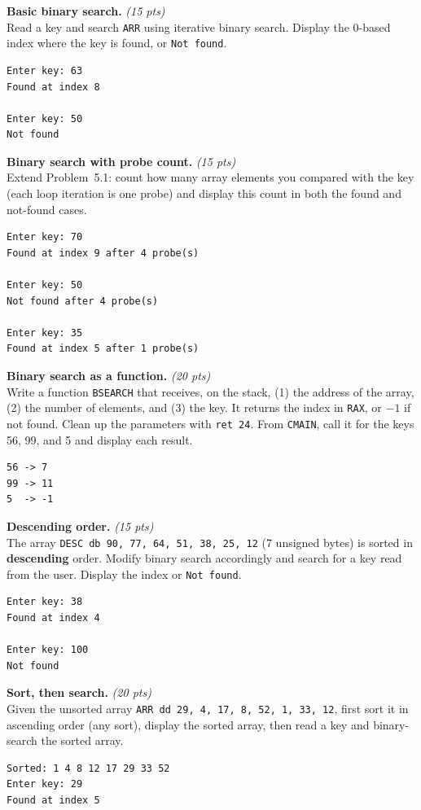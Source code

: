 \documentclass[11pt,letterpaper]{article}
\newcommand{\pts}[1]{\hfill\textit{(#1 pts)}}
\newcommand{\ttl}[1]{\textbf{#1.}}
\begin{document}
\begin{problems}

\item \ttl{Basic binary search} \pts{15}
\\Read a key and search \texttt{ARR} using iterative binary search. Display the 0-based index where the key is found, or \texttt{Not found}.
\begin{lstlisting}[style=out]
Enter key: 63
Found at index 8

Enter key: 50
Not found
\end{lstlisting}

\item \ttl{Binary search with probe count} \pts{15}
\\Extend Problem~5.1: count how many array elements you compared with the key (each loop iteration is one probe) and display this count in both the found and not-found cases.
\begin{lstlisting}[style=out]
Enter key: 70
Found at index 9 after 4 probe(s)

Enter key: 50
Not found after 4 probe(s)

Enter key: 35
Found at index 5 after 1 probe(s)
\end{lstlisting}

\item \ttl{Binary search as a function} \pts{20}
\\Write a function \texttt{BSEARCH} that receives, on the stack, (1) the address of the array, (2) the number of elements, and (3) the key. It returns the index in \texttt{RAX}, or $-1$ if not found. Clean up the parameters with \texttt{ret 24}. From \texttt{CMAIN}, call it for the keys 56, 99, and 5 and display each result.
\begin{lstlisting}[style=out]
56 -> 7
99 -> 11
5  -> -1
\end{lstlisting}

\item \ttl{Descending order} \pts{15}
\\The array \texttt{DESC db 90, 77, 64, 51, 38, 25, 12} (7 unsigned bytes) is sorted in \textbf{descending} order. Modify binary search accordingly and search for a key read from the user. Display the index or \texttt{Not found}.
\begin{lstlisting}[style=out]
Enter key: 38
Found at index 4

Enter key: 100
Not found
\end{lstlisting}

\item \ttl{Sort, then search} \pts{20}
\\Given the unsorted array \texttt{ARR dd 29, 4, 17, 8, 52, 1, 33, 12}, first sort it in ascending order (any sort), display the sorted array, then read a key and binary-search the sorted array.
\begin{lstlisting}[style=out]
Sorted: 1 4 8 12 17 29 33 52
Enter key: 29
Found at index 5
\end{lstlisting}


\end{problems}
\end{document}
